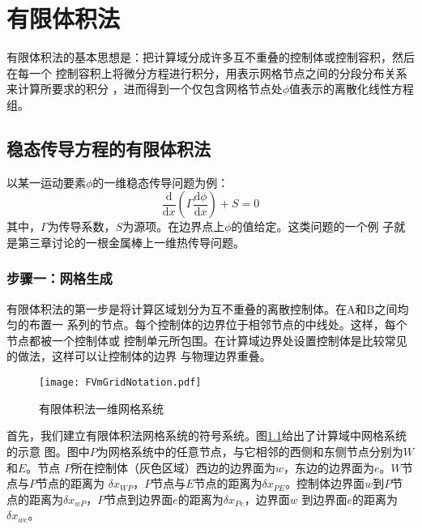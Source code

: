 \chapter{有限体积法}
有限体积法的基本思想是：把计算域分成许多互不重叠的控制体或控制容积，然后在每一个
控制容积上将微分方程进行积分，用表示网格节点之间的分段分布关系来计算所要求的积分
，进而得到一个仅包含网格节点处$\phi$值表示的离散化线性方程组。

\section{稳态传导方程的有限体积法}
以某一运动要素$\phi$的一维稳态传导问题为例：
\begin{equation}
  \frac{\mathrm{d}}{\mathrm{d} x}(\Gamma \frac{\mathrm{d} \phi}{\mathrm{d} x}) +
  S = 0
\end{equation}
其中，$\Gamma$为传导系数，$S$为源项。在边界点上$\phi$的值给定。这类问题的一个例
子就是第三章讨论的一根金属棒上一维热传导问题。

\subsection{步骤一：网格生成}
有限体积法的第一步是将计算区域划分为互不重叠的离散控制体。在A和B之间均匀的布置一
系列的节点。每个控制体的边界位于相邻节点的中线处。这样，每个节点都被一个控制体或
控制单元所包围。在计算域边界处设置控制体是比较常见的做法，这样可以让控制体的边界
与物理边界重叠。
\begin{figure}[h]
  \centering
  \texttt{[image: FVmGridNotation.pdf]}
  \caption{有限体积法一维网格系统}
  \label{FgFV_grid_notation}
\end{figure}

首先，我们建立有限体积法网格系统的符号系统。图\ref{FgFV_grid_notation}给出了计算域中网格系统的示意
图。图中$P$为网格系统中的任意节点，与它相邻的西侧和东侧节点分别为$W$和$E$。节点
$P$所在控制体（灰色区域）西边的边界面为$w$，东边的边界面为$e$。$W$节点与$P$节点的距离为
$\delta x_{WP}$，$P$节点与$E$节点的距离为$\delta x_{PE}$。控制体边界面$w$到$P$节
点的距离为$\delta x_{wP}$，$P$节点到边界面$e$的距离为$\delta x_{Pe}$，边界面$w$
到边界面$e$的距离为$\delta x_{we}$。


